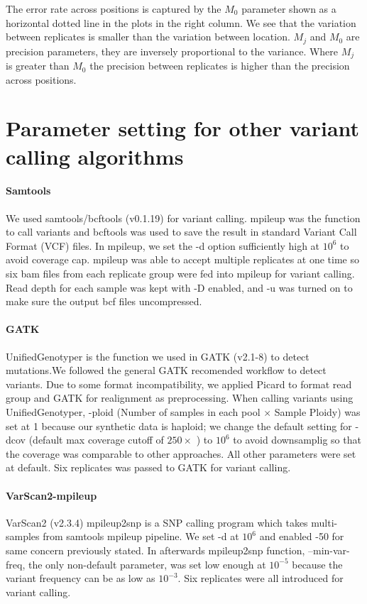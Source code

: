 \documentclass[11pt,reqno]{amsart}
\begin{document}
The error rate across positions is captured by the $M_0$ parameter shown as a horizontal dotted line in the plots in the right column. We see that the variation between replicates is smaller than the variation between location. $M_j$ and $M_0$ are precision parameters, they are inversely proportional to the variance. Where $M_j$ is greater than $M_0$ the precision between replicates is higher than the precision across positions.


\section*{Parameter setting for other variant calling algorithms}

\paragraph{\textbf{Samtools}}We used samtools/bcftools (v0.1.19) for variant calling. mpileup was the function to call variants and bcftools was used to save the result in standard Variant Call Format (VCF) files. In mpileup, we set the -d option sufficiently high at $10^6$ to avoid coverage cap.  mpileup was able to accept multiple replicates at one time so six bam files from each replicate group were fed into mpileup for variant calling. Read depth for each sample was kept with -D enabled, and -u was turned on to make sure the output bcf files uncompressed. 

\paragraph{\textbf{GATK}}
UnifiedGenotyper is the function we used in GATK (v2.1-8) to detect mutations.We followed the general GATK recomended workflow to detect variants. Due to some format  incompatibility, we applied Picard to format read group and GATK for realignment as preprocessing. When calling variants using UnifiedGenotyper, -ploid (Number of samples in each pool $\times$ Sample Ploidy) was set at 1 because our synthetic data is haploid; we change the default setting for -dcov (default max coverage cutoff of $250\times$ ) to $10^6$ to avoid downsamplig so that the coverage was comparable to other approaches. All other parameters were set at default. Six replicates was passed to GATK for variant calling.

\paragraph{\textbf{VarScan2-mpileup}}
VarScan2 (v2.3.4) mpileup2snp is a SNP calling program which takes multi-samples from samtools mpileup pipeline. We set -d at $10^6$ and enabled -50 for same concern previously stated. In afterwards mpileup2snp function, --min-var-freq, the only non-default parameter, was set low enough at $10^{-5}$ because the variant frequency can be as low as $10^{-3}$. Six replicates were all introduced for variant calling.
\end{document}
